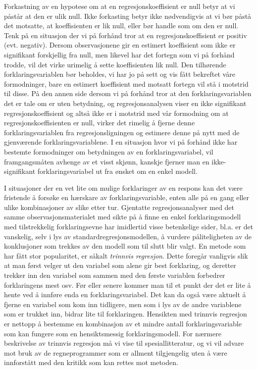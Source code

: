 Forkastning av en hypotese om at en regresjonskoeffisient er null betyr at vi
påstår at den er ulik null.  Ikke forkasting betyr ikke 
nødvendigvis at vi bør påstå det motsatte, at koeffisienten er
lik null, eller bør handle som om den er null.  Tenk på en situasjon
der vi på forhånd tror at en regresjonskoeffisient er positiv (evt.
negativ).  Dersom observasjonene gir en estimert koeffisient som ikke er
signifikant forskjellig fra null, men likevel har det fortegn som vi på
forhånd trodde, vil det virke urimelig å sette koeffisienten lik
null.  Den tilhørende forklaringsvariablen bør beholdes, vi har jo
på sett og vis fått bekreftet våre formodninger, bare en estimert
koeffisient med motsatt fortegn vil stå i motstrid til disse.  På den
annen side dersom vi på forhånd tror at den forklaringsvariablen det
er tale om er uten betydning, og regresjonsanalysen viser en ikke signifikant
regresjonskoeffisient og altså ikke er i motstrid med vår formodning
om at regresjonskoeffisienten er null, virker det rimelig å fjerne denne
forklaringsvariablen fra regresjonsligningen og estimere denne på nytt
med de gjenværende forklaringsvariablene.  I en situasjon hvor vi på
forhånd ikke har bestemte formodninger om betydningen av en 
forklaringsvariabel, vil framgangsmåten avhenge av et visst skjønn,
kanskje fjerner man en ikke-signifikant forklaringsvariabel ut fra ønsket
om en enkel modell.

I situasjoner der en vet lite om mulige forklaringer av en respons kan det
være fristende å forsøke en hærskare av forklaringsvariable,
enten alle på en gang eller ulike kombinasjoner av slike etter tur.
Gjentatte regresjonsanalyser med det samme observasjonsmaterialet med sikte
på å finne en enkel forklaringsmodell med tilstrekkelig 
forklaringsevne har imidlertid visse betenkelige sider, bl.a. er det 
vanskelig, selv i lys av standardregresjonsmodellen, å vurdere 
påliteligheten av de konklusjoner som trekkes av den modell som til slutt
blir valgt.  En metode som har fått stor popularitet,
er såkalt {\em trinnvis regresjon}.  Dette foregår vanligvis slik at 
man først velger ut den variabel som alene gir best forklaring, og deretter
trekker inn den variabel som sammen med den første variablen forbedrer 
forklaringens mest osv.  Før eller senere kommer man til et punkt der det
er lite å hente ved å innføre enda en forklaringsvariabel.  Det
kan da også være aktuelt å fjerne en variabel som kom inn 
tidligere, men som i lys av de andre variablene som er trukket inn, bidrar
lite til forklaringen.  Hensikten med trinnvis regresjon er nettopp å
bestemme en kombinasjon av et mindre antall forklaringsvariable som kan
fungere som en hensiktsmessig forkla\-ringsmodell.  For nærmere beskrivelse
av trinnvis regresjon må vi vise til spesiallitteratur, og vi vil advare
mot bruk av de regneprogrammer som er allment tilgjengelig uten å
være innforstått med den kritikk som kan rettes mot metoden.

